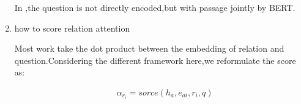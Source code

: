 \documentclass[sigconf]{acmart}
\begin{document}
\begin{enumerate}[(1)]
   		In \cite{min2019knowledge} ,the question is not directly encoded,but with passage jointly by BERT.
   		
   		
   	
   	
   	\item how to score relation attention
   	
	   	Most work take the dot product between the embedding of relation and question.Considering the different framework here,we reformulate the score as:
	   	 
	   	 \begin{displaymath}
	   	 	\begin{aligned}
	   	 		&\alpha_{r_i} = sorce( h_{a},e_{ai},r_i,q)    	 		
	   	 	\end{aligned}
	   	 \end{displaymath}
	     	
   \end{enumerate} 


	
	
	
	
	
	
\end{document}
